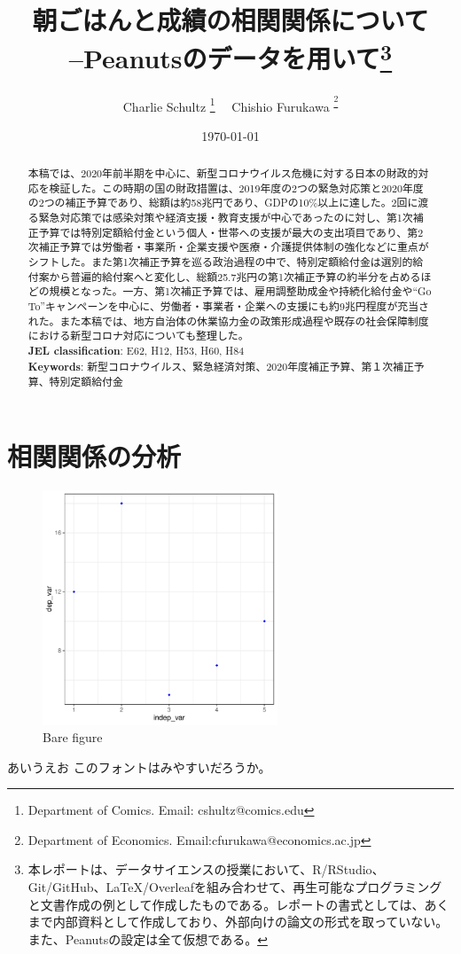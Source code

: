 \documentclass[12pt,a4paper]{article}
\title{\vspace{-0ex}朝ごはんと成績の相関関係について \\ --Peanutsのデータを用いて\thanks{本レポートは、データサイエンスの授業において、R/RStudio、Git/GitHub、LaTeX/Overleafを組み合わせて、再生可能なプログラミングと文書作成の例として作成したものである。レポートの書式としては、あくまで内部資料として作成しており、外部向けの論文の形式を取っていない。また、Peanutsの設定は全て仮想である。}}
\author{Charlie Schultz
\thanks{Department of Comics. Email: cshultz@comics.edu}  \ \  Chishio Furukawa
\textsuperscript\thanks{Department of Economics. Email:cfurukawa@economics.ac.jp}}
\date{\today}
\begin{document}
\renewcommand\footnotelayout{\small}

\maketitle

\vspace{-10pt}\begin{abstract}
\begin{spacing}{1}
\noindent 
本稿では、2020年前半期を中心に、新型コロナウイルス危機に対する日本の財政的対応を検証した。この時期の国の財政措置は、2019年度の2つの緊急対応策と2020年度の2つの補正予算であり、総額は約58兆円であり、GDPの10\%以上に達した。2回に渡る緊急対応策では感染対策や経済支援・教育支援が中心であったのに対し、第1次補正予算では特別定額給付金という個人・世帯への支援が最大の支出項目であり、第2次補正予算では労働者・事業所・企業支援や医療・介護提供体制の強化などに重点がシフトした。また第1次補正予算を巡る政治過程の中で、特別定額給付金は選別的給付案から普遍的給付案へと変化し、総額25.7兆円の第1次補正予算の約半分を占めるほどの規模となった。一方、第1次補正予算では、雇用調整助成金や持続化給付金や``Go To''キャンペーンを中心に、労働者・事業者・企業への支援にも約9兆円程度が充当された。また本稿では、地方自治体の休業協力金の政策形成過程や既存の社会保障制度における新型コロナ対応についても整理した。\\

\noindent\textbf{JEL classification}: E62, H12, H53, H60, H84  \\
\noindent\textbf{Keywords}: 新型コロナウイルス、緊急経済対策、2020年度補正予算、第１次補正予算、特別定額給付金
\end{spacing}
\end{abstract}

\newpage

\section{相関関係の分析} 


\begin{figure}
\centering
\includegraphics[width=7cm]{04_analyze/scatter_regress/figure/figure.pdf}

\label{fig:img1}
\caption{Bare figure}
\end{figure}


あいうえお
このフォントはみやすいだろうか。



\end{document}
